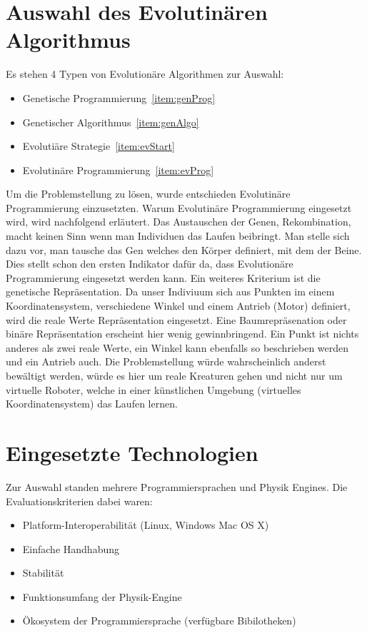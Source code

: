   \section{Auswahl des Evolutinären Algorithmus}

    Es stehen 4 Typen von Evolutionäre Algorithmen zur Auswahl:
    \begin{itemize}
      \item Genetische Programmierung~\ref{item:genProg}
      \item Genetischer Algorithmus~\ref{item:genAlgo}
      \item Evolutiäre Strategie~\ref{item:evStart}
      \item Evolutinäre Programmierung~\ref{item:evProg}
    \end{itemize}
    Um die Problemstellung zu lösen, wurde entschieden Evolutinäre Programmierung einzusetzten.
    Warum Evolutinäre Programmierung eingesetzt wird, wird nachfolgend erläutert.
    Das Austauschen der Genen, Rekombination, macht keinen Sinn wenn man Individuen das Laufen beibringt.
    Man stelle sich dazu vor, man tausche das Gen welches den Körper definiert, mit dem der Beine.
    Dies stellt schon den ersten Indikator dafür da,
    dass Evolutionäre Programmierung eingesetzt werden kann. Ein weiteres Kriterium ist die genetische Repräsentation.
    Da unser Indiviuum sich aus Punkten im einem Koordinatensystem,
    verschiedene Winkel und einem Antrieb (Motor) definiert, wird die reale Werte Repräsentation eingesetzt.
    Eine Baumrepräsenation oder binäre Repräsentation erscheint hier wenig gewinnbringend.
    Ein Punkt ist nichts anderes als zwei reale Werte,
    ein Winkel kann ebenfalls so beschrieben werden und ein Antrieb auch.
    Die Problemstellung würde wahrscheinlich anderst bewältigt werden,
    würde es hier um reale Kreaturen gehen und nicht nur um virtuelle Roboter,
    welche in einer künstlichen Umgebung (virtuelles Koordinatensystem) das Laufen lernen.

  \section{Eingesetzte Technologien\label{sec:Technology}}

    Zur Auswahl standen mehrere Programmiersprachen und Physik Engines.
    Die Evaluationskriterien dabei waren:
    \begin{itemize}
      \item Platform-Interoperabilität (Linux, Windows Mac OS X)
      \item Einfache Handhabung
      \item Stabilität
      \item Funktionsumfang der Physik-Engine
      \item Ökosystem der Programmiersprache (verfügbare Bibilotheken)
    \end{itemize}

